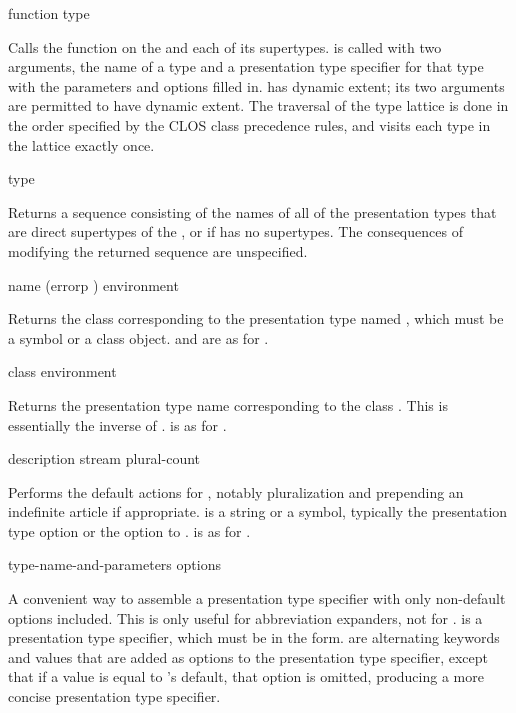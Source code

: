  {function type}

Calls the function  on the 
 and each of its supertypes.   is called with two
arguments, the name of a type and a presentation type specifier for that type
with the parameters and options filled in.   has dynamic extent;
its two arguments are permitted to have dynamic extent.  The traversal of the
type lattice is done in the order specified by the CLOS class precedence rules,
and visits each type in the lattice exactly once.


 {type}

Returns a sequence consisting of the names of all of the presentation types that
are direct supertypes of the  , or
 if  has no supertypes.  The consequences of modifying the
returned sequence are unspecified.


 {name \optional (errorp ) environment}

Returns the class corresponding to the presentation type named , which
must be a symbol or a class object.   and  are as
for .


 {class \optional environment}

Returns the presentation type name corresponding to the class .  This
is essentially the inverse of .
 is as for .


 {description stream plural-count}

Performs the default actions for , notably
pluralization and prepending an indefinite article if appropriate.
 is a string or a symbol, typically the 
presentation type option or the  option to
.   is as for
.


 {type-name-and-parameters \rest options}

A convenient way to assemble a presentation type specifier with only non-default
options included.  This is only useful for abbreviation expanders, not for
.   is a presentation type
specifier, which must be in the  form.
 are alternating keywords and values that are added as options to
the presentation type specifier, except that if a value is equal to
's default, that option is omitted, producing a more concise
presentation type specifier.


